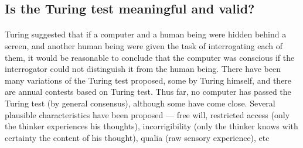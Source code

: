 \documentclass[]{article}
\begin{document}
\subsection{Is the Turing test meaningful and valid?}
\paragraph{}
Turing suggested that if a computer and a human being were hidden behind a screen, and another
human being were given the task of interrogating each of them, it would be reasonable to conclude that the computer was conscious if the interrogator could not distinguish it
from the human being. There have been many variations of the Turing test proposed, some by Turing himself, and there are annual contests based on Turing test. Thus far, no computer has
passed the Turing test (by general consensus), although some have come close. Several plausible characteristics have been proposed — free will, restricted access (only the thinker experiences his thoughts), incorrigibility (only the thinker knows with certainty the content of his thought), qualia (raw sensory experience), etc
\end{document}
